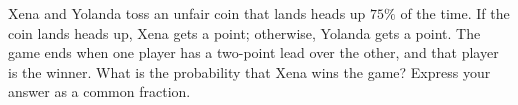 Xena and Yolanda toss an unfair coin that lands heads up $75\%$ of the time. If the coin lands heads up, Xena gets a point; otherwise, Yolanda gets a point. The game ends when one player has a two-point lead over the other, and that player is the winner. What is the probability that Xena wins the game? Express your answer as a common fraction.
